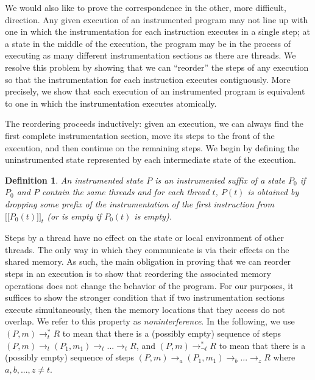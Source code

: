 \documentclass[preprint, 10pt]{sigplanconf}
\newcommand{\meanl}{\ensuremath{[ \! [}}
\newcommand{\meanr}{\ensuremath{] \! ]}}
\newcommand{\means}[1]{\ensuremath{\meanl #1 \meanr}}
\newcommand{\instr}[2]{\ensuremath{\means{#2}_{#1}}}
\newcommand{\cfg}[2]{\ensuremath{(#1, #2)}}
\newcommand{\execstart}[4]{\ensuremath{\cfg{#1}{#2} \rightarrow^{*}_{#3} #4}}
\newcommand{\execstarm}[4]{\ensuremath{\cfg{#1}{#2} \rightarrow^{*}_{\neg #3} #4}}
\newtheorem{definition}{Definition}
\begin{document}
We would also like to prove the correspondence in the other, more difficult, direction. Any given execution of an instrumented program may not line up with one in which the instrumentation for each instruction executes in a single step; at a state in the middle of the execution, the program may be in the process of executing as many different instrumentation sections as there are threads. We resolve this problem by showing that we can ``reorder'' the steps of any execution so that the instrumentation for each instruction executes contiguously. More precisely, we show that each execution of an instrumented program is equivalent to one in which the instrumentation executes atomically.

The reordering proceeds inductively: given an execution, we can always find the first complete instrumentation section, move its steps to the front of the execution, and then continue on the remaining steps. We begin by defining the uninstrumented state represented by each intermediate state of the execution.
\begin{definition}An instrumented state $P$ is an \emph{instrumented suffix} of a state $P_0$ if $P_0$ and $P$ contain the same threads and for each thread $t$, $P(t)$ is obtained by dropping some prefix of the instrumentation of the first instruction from $\instr{t}{P_0(t)}$ (or is empty if $P_0(t)$ is empty).\end{definition}

Steps by a thread have no effect on the state or local environment of other threads. The only way in which they communicate is via their effects on the shared memory. As such, the main obligation in proving that we can reorder steps in an execution is to show that reordering the associated memory operations does not change the behavior of the program. For our purposes, it suffices to show the stronger condition that if two instrumentation sections execute simultaneously, then the memory locations that they access do not overlap. We refer to this property as \emph{noninterference}. In the following, we use $\execstart{P}{m}{t}{R}$ to mean that there is a (possibly empty) sequence of steps $(P, m) \rightarrow_t (P_1, m_1) \rightarrow_t ... \rightarrow_t R$, and $\execstarm{P}{m}{t}{R}$ to mean that there is a (possibly empty) sequence of steps $(P, m) \rightarrow_a (P_1, m_1) \rightarrow_b ... \rightarrow_z R$ 
where $a, b, ..., z \neq t$. 
\end{document}
